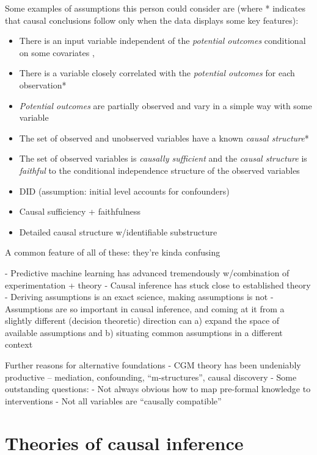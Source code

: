 Some examples of assumptions this person could consider are (where * indicates that causal conclusions follow only when the data displays some key features):
\begin{itemize}
    \item There is an input variable independent of the \emph{potential outcomes} conditional on some covariates \citep[Chap. ~12]{imbens_causal_2015}, \citep[Chaps ~2, 3, 5]{angrist_mastering_2014}
    \item There is a variable closely correlated with the \emph{potential outcomes} for each observation*
    \item \emph{Potential outcomes} are partially observed and vary in a simple way with some variable
    \item The set of observed and unobserved variables have a known \emph{causal structure}*
    \item The set of observed variables is \emph{causally sufficient} and the \emph{causal structure} is \emph{faithful} to the conditional independence structure of the observed variables

    \item DID (assumption: initial level accounts for confounders)
    \item Causal sufficiency + faithfulness
    \item Detailed causal structure w/identifiable substructure
\end{itemize}

A common feature of all of these: they're kinda confusing



 - Predictive machine learning has advanced tremendously w/combination of experimentation + theory
 - Causal inference has stuck close to established theory
 - Deriving assumptions is an exact science, making assumptions is not
 - Assumptions are so important in causal inference, and coming at it from a slightly different (decision theoretic) direction can a) expand the space of available assumptions and b) situating common assumptions in a different context


 Further reasons for alternative foundations
 - CGM theory has been undeniably productive -- mediation, confounding, ``m-structures'', causal discovery
 - Some outstanding questions:
 - Not always obvious how to map pre-formal knowledge to interventions
 - Not all variables are ``causally compatible''



\section{Theories of causal inference}

